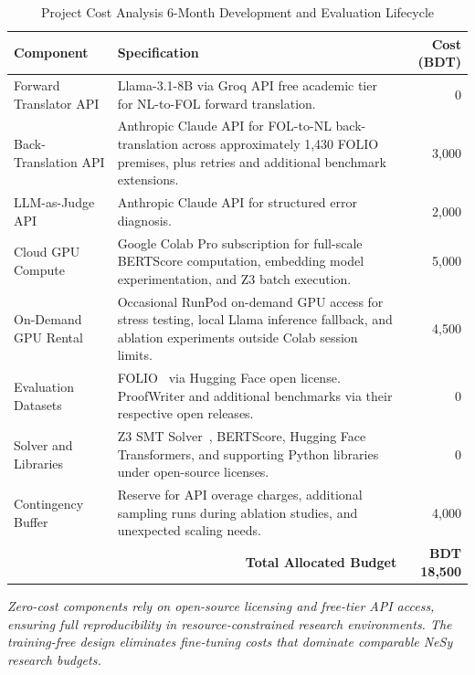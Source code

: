 \begin{table}[htbp]
\centering
\renewcommand{\arraystretch}{1.4}
\begin{tabular}{|p{2.8cm}|p{7.8cm}|r|}
\hline
\textbf{Component} & \textbf{Specification} & \textbf{Cost (BDT)} \\
\hline
Forward Translator API &
Llama-3.1-8B via Groq API free academic tier for NL-to-FOL forward translation. &
0 \\
\hline
Back-Translation API &
Anthropic Claude API for FOL-to-NL back-translation across approximately 1,430 FOLIO premises, plus retries and additional benchmark extensions. &
3,000 \\
\hline
LLM-as-Judge API &
Anthropic Claude API for structured error diagnosis. &
2,000 \\
\hline
Cloud GPU Compute &
Google Colab Pro subscription for full-scale BERTScore computation, embedding model experimentation, and Z3 batch execution. &
5,000 \\
\hline
On-Demand GPU Rental &
Occasional RunPod on-demand GPU access for stress testing, local Llama inference fallback, and ablation experiments outside Colab session limits. &
4,500 \\
\hline
Evaluation Datasets &
FOLIO~\cite{han2024folio} via Hugging Face open license. ProofWriter and additional benchmarks via their respective open releases. &
0 \\
\hline
Solver and Libraries &
Z3 SMT Solver~\cite{demoura2008z3}, BERTScore, Hugging Face Transformers, and supporting Python libraries under open-source licenses. &
0 \\
\hline
Contingency Buffer &
Reserve for API overage charges, additional sampling runs during ablation studies, and unexpected scaling needs. &
4,000 \\
\hline

\multicolumn{2}{|r|}{\textbf{Total Allocated Budget}} &
\textbf{BDT 18,500} \\
\hline
\end{tabular}
\caption{Project Cost Analysis  6-Month Development and Evaluation Lifecycle}
\label{tab:project_cost_analysis}
\end{table}

\noindent\textit{Zero-cost components rely on open-source licensing and free-tier API access, ensuring full reproducibility in resource-constrained research environments. The training-free design eliminates fine-tuning costs that dominate comparable NeSy research budgets.}
\clearpage

